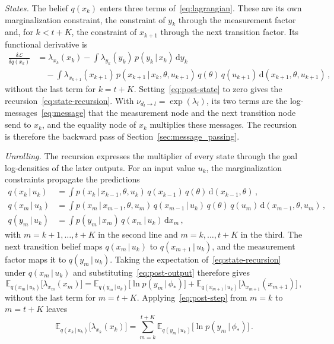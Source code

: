 \documentclass{l4dc2027}
\def\rmd{\mathrm{d}}
\newcommand\given[1][]{\,#1\vert\,}
\newcommand{\E}{\mathbb{E}}
\newenvironment{proofof}[1]{\par\noindent{\bfseries\upshape Proof of #1\ }}{\jmlrQED}
\begin{document}
\begin{proofof}{Theorem~\ref{thm:posterior}}
\emph{States.} The belief $q(x_k)$ enters three terms of~\eqref{eq:lagrangian}. These are its own marginalization constraint, the constraint of $y_k$ through the measurement factor and, for $k < t+K$, the constraint of $x_{k+1}$ through the next transition factor. Its functional derivative is
\begin{align}
	\frac{\delta \mathcal{L}}{\delta q(x_k)} &= \lambda_{x_k}(x_k) - \int \lambda_{y_k}(y_k)\, p(y_k \given x_k)\, \rmd y_k \nonumber\\
	&\quad - \int \lambda_{x_{k+1}}(x_{k+1})\, p(x_{k+1} \given x_k, \theta, u_{k+1})\, q(\theta)\, q(u_{k+1})\, \rmd(x_{k+1}, \theta, u_{k+1}) \, , \label{eq:post-state}
\end{align}
without the last term for $k = t+K$. Setting~\eqref{eq:post-state} to zero gives the recursion~\eqref{eq:state-recursion}. With $\nu_{d_l \to l} = \exp(\lambda_l)$, its two terms are the log-messages~\eqref{eq:message} that the measurement node and the next transition node send to $x_k$, and the equality node of $x_k$ multiplies these messages. The recursion is therefore the backward pass of Section~\ref{sec:message_passing}.

\emph{Unrolling.} The recursion expresses the multiplier of every state through the goal log-densities of the later outputs. For an input value $u_k$, the marginalization constraints propagate the predictions
\begin{align}
	q(x_k \given u_k) &= \int p(x_k \given x_{k-1}, \theta, u_k)\, q(x_{k-1})\, q(\theta)\, \rmd(x_{k-1}, \theta) \, , \nonumber\\
	q(x_m \given u_k) &= \int p(x_m \given x_{m-1}, \theta, u_m)\, q(x_{m-1} \given u_k)\, q(\theta)\, q(u_m)\, \rmd(x_{m-1}, \theta, u_m) \, , \label{eq:post-predictions}\\
	q(y_m \given u_k) &= \int p(y_m \given x_m)\, q(x_m \given u_k)\, \rmd x_m \, , \nonumber
\end{align}
with $m = k+1, \dots, t+K$ in the second line and $m = k, \dots, t+K$ in the third. The next transition belief maps $q(x_m \given u_k)$ to $q(x_{m+1} \given u_k)$, and the measurement factor maps it to $q(y_m \given u_k)$. Taking the expectation of~\eqref{eq:state-recursion} under $q(x_m \given u_k)$ and substituting~\eqref{eq:post-output} therefore gives
\begin{equation}\label{eq:post-step}
	\E_{q(x_m \given u_k)}\big[\lambda_{x_m}(x_m)\big] = \E_{q(y_m \given u_k)}\big[\ln p(y_m \given \phi_*)\big] + \E_{q(x_{m+1} \given u_k)}\big[\lambda_{x_{m+1}}(x_{m+1})\big] \, ,
\end{equation}
without the last term for $m = t+K$. Applying~\eqref{eq:post-step} from $m = k$ to $m = t+K$ leaves
\begin{equation}\label{eq:post-unrolled}
	\E_{q(x_k \given u_k)}\big[\lambda_{x_k}(x_k)\big] = \sum_{m=k}^{t+K} \E_{q(y_m \given u_k)}\big[\ln p(y_m \given \phi_*)\big] \, .
\end{equation}


\end{proofof}
\end{document}
